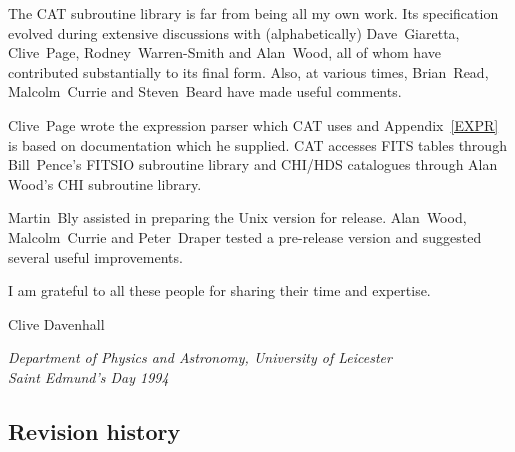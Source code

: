 The CAT subroutine library is far from being all my own work. Its
specification evolved during extensive discussions with (alphabetically)
Dave~Giaretta, Clive~Page, Rodney~Warren-Smith and Alan~Wood, all of 
whom have contributed substantially to its final form. Also, at various 
times, Brian~Read, Malcolm~Currie and Steven~Beard have made useful 
comments.

Clive~Page wrote the expression parser which CAT uses and 
Appendix~\ref{EXPR} is based on documentation which he supplied. CAT 
accesses FITS tables through Bill~Pence's FITSIO subroutine library
and CHI/HDS catalogues through Alan Wood's CHI subroutine library.

Martin~Bly assisted in preparing the Unix version for release.
Alan~Wood, Malcolm~Currie and Peter~Draper tested a pre-release version 
and suggested several useful improvements.

I am grateful to all these people for sharing their time and expertise.
\begin{flushright}
Clive Davenhall \\
\raggedright {\it Department of Physics and Astronomy, University of 
Leicester \\
Saint Edmund's Day 1994}
\end{flushright} 

\newpage
\subsection*{Revision history}

